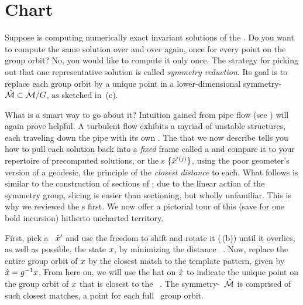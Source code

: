 \documentclass[aip,cha,reprint,
secnumarabic,
nofootinbib, tightenlines,
nobibnotes, showkeys, showpacs,
groupedaddress
]{revtex4-1}
\begin{document}
\section{Chart}
\label{s:slice}

Suppose  is computing numerically exact invariant solutions
of the \NSe. Do you want to compute the same solution over and
over again, once for every point on the group orbit? No, you would like to
compute it only once. The strategy for picking out that one
representative solution is called \emph{symmetry reduction}. Its goal is
to replace each group orbit by a unique point in a lower-dimensional
symmetry-\reducedsp\ $\hat{\cal M} \subset {\cal M}/G$, as sketched in
\,(c).

What is a smart way to go about it? Intuition gained from pipe flow (see
) will again prove helpful. A turbulent flow
exhibits a myriad of unstable structures, each traveling down the pipe
with its own {\phaseVel}. The
\mslices{} that we now
describe tells you how to pull each solution back into a {\em fixed}
frame called a \emph{\slice} and compare it to your repertoire of
precomputed solutions, or the \template s $\{{\hat{x}'}{}^{(j)}\}$, using the
poor geometer's version of a geodesic, the principle of the \emph{closest
distance} to each. What follows is similar to the construction of
sections of ; due to the linear action of the symmetry
group, slicing is easier than sectioning, but wholly unfamiliar. This is
why we reviewed the \PoincSec s first. We now offer a pictorial tour of
this (save for one bold incursion) hitherto uncharted
territory.

First, pick a \template\ ${\hat{x}'}$ and use the freedom to shift and
rotate it (\,(b)) until it overlies, as well as
possible, the state $x$, by minimizing the distance
\beq
\Norm{\ssp - \LieEl(\gSpace)\,\slicep}
\, .
Now, replace the entire group orbit of $x$ by the closest match to the
template pattern, given by $\hat{x}=g^{-1}x$. From here on, we
will use the hat on $\hat{x}$ to indicate the unique point on the group
orbit of $x$ that is closest to the \template\ \slicep. The
symmetry-\reducedsp\ $\hat{\cal M}$ is comprised of such closest matches, a
point for each full \statesp\ group orbit.
\end{document}
